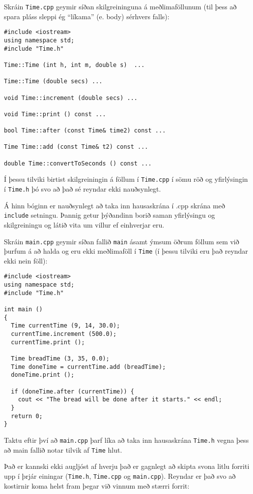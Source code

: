 Skráin {\tt Time.cpp} geymir síðan skilgreininguna á meðlimaföllunum (til þess að spara pláss sleppi ég ``líkama'' (e. body) sérhvers falls):

\begin{verbatim}
#include <iostream>
using namespace std;
#include "Time.h"

Time::Time (int h, int m, double s)  ...

Time::Time (double secs) ...

void Time::increment (double secs) ...

void Time::print () const ...

bool Time::after (const Time& time2) const ...

Time Time::add (const Time& t2) const ...

double Time::convertToSeconds () const ...
\end{verbatim}
%
Í þessu tilviki birtist skilgreiningin á föllum í {\tt Time.cpp} í sömu röð og yfirlýsingin í {\tt Time.h} þó svo að það sé reyndar ekki nauðsynlegt.

Á hinn bóginn er nauðsynlegt að taka inn hausaskrána í .cpp skrána með {\tt include} setningu.
Þannig getur þýðandinn borið saman yfirlýsingu og skilgreiningu og látið vita um villur ef einhverjar eru.

Skráin {\tt main.cpp} geymir síðan fallið {\tt main} ásamt ýmsum öðrum föllum sem við þurfum á að halda og eru ekki meðlimaföll í {\tt Time} (í þessu tilviki eru það reyndar ekki nein föll):

\begin{verbatim}
#include <iostream>
using namespace std;
#include "Time.h"

int main ()
{
  Time currentTime (9, 14, 30.0);
  currentTime.increment (500.0);
  currentTime.print ();

  Time breadTime (3, 35, 0.0);
  Time doneTime = currentTime.add (breadTime);
  doneTime.print ();

  if (doneTime.after (currentTime)) {
    cout << "The bread will be done after it starts." << endl;
  }
  return 0;
}

\end{verbatim}
%
Taktu eftir því að {\tt main.cpp} þarf líka að taka inn hausaskrána {\tt Time.h} vegna þess að main fallið notar tilvik af {\tt Time} hlut.  

Það er kannski ekki augljóst af hverju það er gagnlegt að skipta svona litlu forriti upp í þrjár einingar ({\tt Time.h}, {\tt Time.cpp} og {\tt main.cpp}).
Reyndar er það svo að kostirnir koma helst fram þegar við vinnum með stærri forrit:

